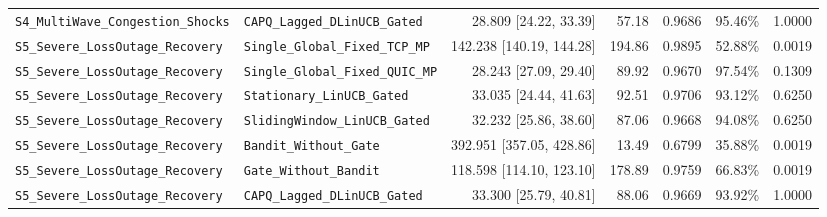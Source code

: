 \begin{table}[t]
{\begin{tabular}{@{}llrrrrr@{}}
\texttt{S4\_MultiWave\_Congestion\_Shocks} & \texttt{CAPQ\_Lagged\_DLinUCB\_Gated} & 28.809 [24.22, 33.39] & 57.18 & 0.9686 & 95.46\% & 1.0000 \\
\texttt{S5\_Severe\_LossOutage\_Recovery} & \texttt{Single\_Global\_Fixed\_TCP\_MP} & 142.238 [140.19, 144.28] & 194.86 & 0.9895 & 52.88\% & 0.0019 \\
\texttt{S5\_Severe\_LossOutage\_Recovery} & \texttt{Single\_Global\_Fixed\_QUIC\_MP} & 28.243 [27.09, 29.40] & 89.92 & 0.9670 & 97.54\% & 0.1309 \\
\texttt{S5\_Severe\_LossOutage\_Recovery} & \texttt{Stationary\_LinUCB\_Gated} & 33.035 [24.44, 41.63] & 92.51 & 0.9706 & 93.12\% & 0.6250 \\
\texttt{S5\_Severe\_LossOutage\_Recovery} & \texttt{SlidingWindow\_LinUCB\_Gated} & 32.232 [25.86, 38.60] & 87.06 & 0.9668 & 94.08\% & 0.6250 \\
\texttt{S5\_Severe\_LossOutage\_Recovery} & \texttt{Bandit\_Without\_Gate} & 392.951 [357.05, 428.86] & 13.49 & 0.6799 & 35.88\% & 0.0019 \\
\texttt{S5\_Severe\_LossOutage\_Recovery} & \texttt{Gate\_Without\_Bandit} & 118.598 [114.10, 123.10] & 178.89 & 0.9759 & 66.83\% & 0.0019 \\
\texttt{S5\_Severe\_LossOutage\_Recovery} & \texttt{CAPQ\_Lagged\_DLinUCB\_Gated} & 33.300 [25.79, 40.81] & 88.06 & 0.9669 & 93.92\% & 1.0000 \\
\bottomrule
\end{tabular}%
}
\end{table}
